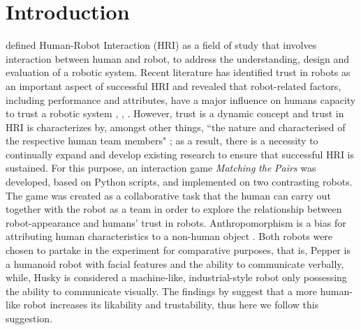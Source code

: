 \documentclass[letterpaper]{article} %
\begin{document}
\section{Introduction}
\cite{murphy2010human} defined Human-Robot Interaction (HRI) as a field of study that involves interaction between human and robot, to address the understanding, design and evaluation of a robotic system. Recent literature has identified trust in robots as an important aspect of successful HRI and revealed that robot-related factors, including performance and attributes, have a major influence on humans capacity to trust a robotic system \cite{hancock2011meta}, \cite{billings2012human}, \cite{sanders2011model}. However, trust is a dynamic concept \cite{chang2010seeing} and trust in HRI is characterizes by, amongst other things,  ``the nature and characterised of the respective human team members" \cite{maurtua2017human}; as a result, there is a necessity to continually expand and develop existing research to ensure that successful HRI is sustained. For this purpose, an interaction game \textit{Matching} \textit{the} \textit{Pairs} was developed, based on Python scripts, and implemented on two contrasting robots. The game was created as a collaborative task that the human can carry out together with the robot as a team in order to explore the relationship between robot-appearance and humans' trust in robots. Anthropomorphism is a bias for attributing human characteristics to a non-human object \cite{duffy2003anthropomorphism}. Both robots were chosen to partake in the experiment for comparative purposes, that is, Pepper is a humanoid robot with facial features and the ability to communicate verbally, while, Husky is considered a machine-like, industrial-style robot only possessing the ability to communicate visually. The findings by \cite{li2010cross} suggest that a more human-like robot increases its likability and trustability, thus here we follow this suggestion. 
\end{document}

